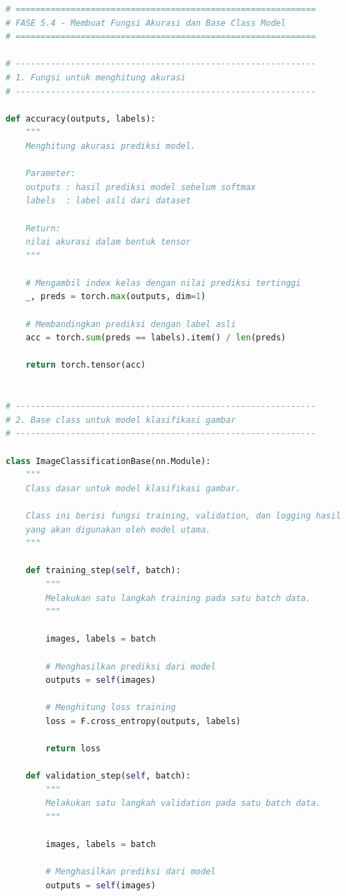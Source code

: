 \begin{lstlisting}[language=Python, caption=Membuat fungsi akurasi dan base class]
# ============================================================
# FASE 5.4 - Membuat Fungsi Akurasi dan Base Class Model
# ============================================================

# ------------------------------------------------------------
# 1. Fungsi untuk menghitung akurasi
# ------------------------------------------------------------

def accuracy(outputs, labels):
    """
    Menghitung akurasi prediksi model.

    Parameter:
    outputs : hasil prediksi model sebelum softmax
    labels  : label asli dari dataset

    Return:
    nilai akurasi dalam bentuk tensor
    """

    # Mengambil index kelas dengan nilai prediksi tertinggi
    _, preds = torch.max(outputs, dim=1)

    # Membandingkan prediksi dengan label asli
    acc = torch.sum(preds == labels).item() / len(preds)

    return torch.tensor(acc)


# ------------------------------------------------------------
# 2. Base class untuk model klasifikasi gambar
# ------------------------------------------------------------

class ImageClassificationBase(nn.Module):
    """
    Class dasar untuk model klasifikasi gambar.

    Class ini berisi fungsi training, validation, dan logging hasil
    yang akan digunakan oleh model utama.
    """

    def training_step(self, batch):
        """
        Melakukan satu langkah training pada satu batch data.
        """

        images, labels = batch

        # Menghasilkan prediksi dari model
        outputs = self(images)

        # Menghitung loss training
        loss = F.cross_entropy(outputs, labels)

        return loss

    def validation_step(self, batch):
        """
        Melakukan satu langkah validation pada satu batch data.
        """

        images, labels = batch

        # Menghasilkan prediksi dari model
        outputs = self(images)


\end{lstlisting}
